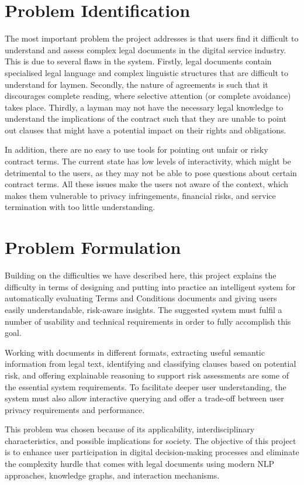 \section{Problem Identification}
The most important problem the project addresses is that users
find it difficult to understand and assess complex legal documents in
the digital service industry. This is due to several
flaws in the system. Firstly, legal documents contain specialised legal language
and complex linguistic structures that are difficult to understand
for laymen. Secondly, the nature of agreements is such that it discourages
complete reading, where selective attention (or complete avoidance)
takes place. Thirdly, a layman may not have
the necessary legal knowledge to understand the implications of the contract
such that they are unable to point out clauses that might have a
potential impact on their rights and obligations.

In addition, there are no easy to use tools for pointing out
unfair or risky contract terms. The current state has
low levels of interactivity, which might be detrimental to the
users, as they may not be able to pose questions about certain
contract terms. All these issues make the users not aware of the context, 
which makes them vulnerable to privacy
infringements, financial risks, and service termination with
too little understanding.

\section{Problem Formulation}
Building on the difficulties we have described here, this project
explains the difficulty in terms of designing and putting into
practice an intelligent system for automatically evaluating Terms and
Conditions documents and giving users easily understandable,
risk-aware insights. The suggested system must fulfil a number of
usability and technical requirements in order to fully accomplish this goal.

Working with documents in different formats, extracting useful
semantic information from legal text, identifying and classifying
clauses based on potential risk, and offering explainable reasoning
to support risk assessments are some of the essential system
requirements. To facilitate deeper user understanding, the system
must also allow interactive querying and offer a trade-off between
user privacy requirements and performance.

This problem was chosen because of its applicability,
interdisciplinary characteristics, and possible implications for
society. The objective of this project is to enhance user
participation in digital decision-making processes and eliminate the
complexity hurdle that comes with legal documents using modern NLP
approaches, knowledge graphs, and interaction mechanisms.
